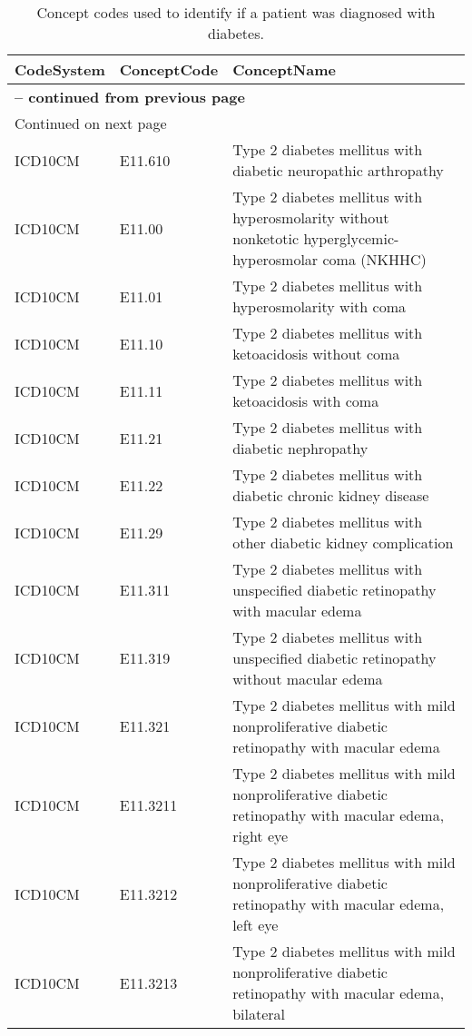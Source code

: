 \begin{longtable}{p{}p{}p{}}
\caption{Concept codes used to identify if a patient was diagnosed with diabetes.} \\ 
 CodeSystem & ConceptCode & ConceptName \\ 
  \hline 
\endfirsthead 
\multicolumn{3}{p{\textwidth}}{{ \bfseries \tablename \thetable{} -- continued from previous page}} \ 
\hline CodeSystem & ConceptCode & ConceptName \\ \hline 
\endhead 
\hline \multicolumn{3}{p{\textwidth}}{{Continued on next page}} \\ \hline 
\endfoot 
\hline 
\endlastfoot 
 \hline
ICD10CM & E11.610 & Type 2 diabetes mellitus with diabetic neuropathic arthropathy \\ 
  ICD10CM & E11.00 & Type 2 diabetes mellitus with hyperosmolarity without nonketotic hyperglycemic-hyperosmolar coma (NKHHC) \\ 
  ICD10CM & E11.01 & Type 2 diabetes mellitus with hyperosmolarity with coma \\ 
  ICD10CM & E11.10 & Type 2 diabetes mellitus with ketoacidosis without coma \\ 
  ICD10CM & E11.11 & Type 2 diabetes mellitus with ketoacidosis with coma \\ 
  ICD10CM & E11.21 & Type 2 diabetes mellitus with diabetic nephropathy \\ 
  ICD10CM & E11.22 & Type 2 diabetes mellitus with diabetic chronic kidney disease \\ 
  ICD10CM & E11.29 & Type 2 diabetes mellitus with other diabetic kidney complication \\ 
  ICD10CM & E11.311 & Type 2 diabetes mellitus with unspecified diabetic retinopathy with macular edema \\ 
  ICD10CM & E11.319 & Type 2 diabetes mellitus with unspecified diabetic retinopathy without macular edema \\ 
  ICD10CM & E11.321 & Type 2 diabetes mellitus with mild nonproliferative diabetic retinopathy with macular edema \\ 
  ICD10CM & E11.3211 & Type 2 diabetes mellitus with mild nonproliferative diabetic retinopathy with macular edema, right eye \\ 
  ICD10CM & E11.3212 & Type 2 diabetes mellitus with mild nonproliferative diabetic retinopathy with macular edema, left eye \\ 
  ICD10CM & E11.3213 & Type 2 diabetes mellitus with mild nonproliferative diabetic retinopathy with macular edema, bilateral \\ 

\end{longtable}
